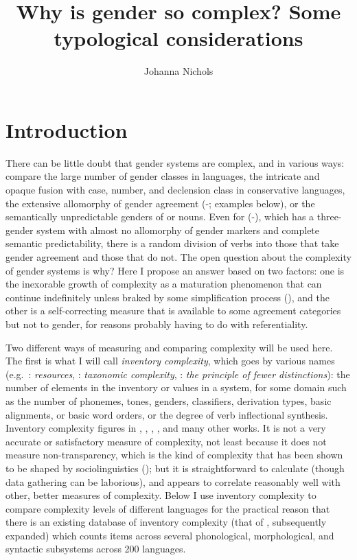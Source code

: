 \documentclass[output=collectionpaper]{langsci/langscibook}
\title{Why is gender so complex? Some typological considerations}
\author{%
Johanna Nichols
\affiliation{University of California, Berkeley}
}%
\begin{document}
\section{Introduction}
There can be little doubt that gender systems are complex, and in various ways: compare the large number of gender classes in  languages, the intricate and opaque fusion with case, number, and declension class in conservative  languages, the extensive allomorphy of  gender agreement (-; examples below), or the semantically unpredictable genders of  or  nouns.  Even for  (-), which has a three-gender system with almost no allomorphy of gender markers and complete semantic predictability, there is a random division of verbs into those that take gender agreement and those that do not. The open question about the complexity of gender systems is why? Here I propose an answer based on two factors:  one is the inexorable growth of complexity as a maturation phenomenon that can continue indefinitely unless braked by some simplification process (\citealt{Dahl2004,Trudgill2011}), and the other is a self-correcting measure that is available to some agreement categories but not to gender, for reasons probably having to do with referentiality.

Two different ways of measuring and comparing complexity will be used here. The first is what I will call \textit{inventory complexity}, which goes by various names (e.g.\ \citealt{Dahl2004}: \textit{resources}, \citealt{Miestamo2008}: \textit{taxonomic complexity}, : \textit{the principle of fewer distinctions}): the number of elements in the inventory or values in a system, for some domain such as the number of phonemes, tones, genders, classifiers, derivation types, basic alignments, or basic word orders, or the degree of verb inflectional synthesis. Inventory complexity figures in \citet{Dahl2004}, \citet{Shosted2006}, \citet{Nichols2009}, \citet{Donohue2011}, and many other works. It is not a very accurate or satisfactory measure of complexity, not least because it does not measure non-transparency, which is the kind of complexity that has been shown to be shaped by sociolinguistics (\citealt{Trudgill2011}); but it is straightforward to calculate (though data gathering can be laborious), and appears to correlate reasonably well with other, better measures of complexity. Below I use inventory complexity to compare complexity levels of different languages for the practical reason that there is an existing database of inventory complexity (that of \citealt{Nichols2009}, subsequently expanded) which counts items across several phonological, morphological, and syntactic subsystems across 200 languages.
\end{document}
